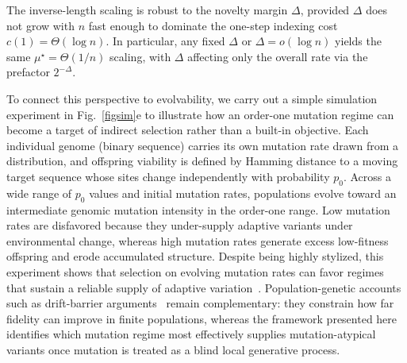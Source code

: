 \documentclass[9pt,twocolumn,oneside]{pnas-new}
\begin{document}

The inverse-length scaling is robust to the novelty margin $\Delta$, provided $\Delta$ does not grow with $n$ fast enough to dominate the one-step indexing cost $c(1)=\Theta(\log n)$. In particular, any fixed $\Delta$ or $\Delta=o(\log n)$ yields the same $\mu^\star=\Theta(1/n)$ scaling, with $\Delta$ affecting only the overall rate via the prefactor $2^{-\Delta}$.


{\color{red}
To connect this perspective to evolvability, we carry out a simple simulation experiment in Fig.~\ref{figsim}e to illustrate how an order-one mutation regime can become a target of indirect selection rather than a built-in objective.
Each individual genome (binary sequence) carries its own mutation rate drawn from a distribution, and offspring viability is defined by Hamming distance to a moving target sequence whose sites change independently with probability $p_0$. Across a wide range of $p_0$ values and initial mutation rates, populations evolve toward an intermediate genomic mutation intensity in the order-one range. Low mutation rates are disfavored because they under-supply adaptive variants under environmental change, whereas high mutation rates generate excess low-fitness offspring and erode accumulated structure.
Despite being highly stylized, this experiment shows that selection on evolving mutation rates can favor regimes that sustain a reliable supply of adaptive variation~\cite{sniegowski2000evolution,raynes2014experimental}. Population-genetic accounts such as drift-barrier arguments~\cite{Sung2012DriftBarrier} remain complementary: they constrain how far fidelity can improve in finite populations, whereas the framework presented here identifies which mutation regime most effectively supplies mutation-atypical variants once mutation is treated as a blind local generative process.
}




  
\end{document}
